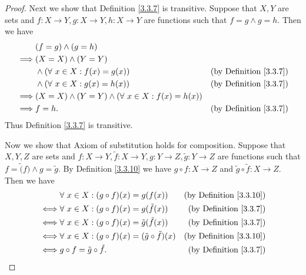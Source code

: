 \begin{proof}
    Next we show that Definition \ref{3.3.7} is transitive.
    Suppose that \(X, Y\) are sets and \(f : X \to Y, g : X \to Y, h : X \to Y\) are functions such that \(f = g \land g = h\).
    Then we have
    \begin{align*}
                 & (f = g) \land (g = h)                                                                             \\
        \implies & (X = X) \land (Y = Y)                                                                             \\
                 & \land (\forall\ x \in X : f(x) = g(x))                       & \text{(by Definition \ref{3.3.7})} \\
                 & \land (\forall\ x \in X : g(x) = h(x))                       & \text{(by Definition \ref{3.3.7})} \\
        \implies & (X = X) \land (Y = Y) \land (\forall\ x \in X : f(x) = h(x))                                      \\
        \implies & f = h.                                                       & \text{(by Definition \ref{3.3.7})}
    \end{align*}
    Thus Definition \ref{3.3.7} is transitive.

    Now we show that Axiom of substitution holds for composition.
    Suppose that \(X, Y, Z\) are sets and \(f : X \to Y, \tilde{f} : X \to Y, g : Y \to Z, \tilde{g} : Y \to Z\) are functions such that \(f = \tilde(f) \land g = \tilde{g}\).
    By Definition \ref{3.3.10} we have \(g \circ f : X \to Z\) and \(\tilde{g} \circ \tilde{f} : X \to Z\).
    Then we have
    \begin{align*}
             & \forall\ x \in X : (g \circ f)(x) = g(f(x))                        & \text{(by Definition \ref{3.3.10})} \\
        \iff & \forall\ x \in X : (g \circ f)(x) = g(\tilde{f}(x))                & \text{(by Definition \ref{3.3.7})}  \\
        \iff & \forall\ x \in X : (g \circ f)(x) = \tilde{g}(\tilde{f}(x))        & \text{(by Definition \ref{3.3.7})}  \\
        \iff & \forall\ x \in X : (g \circ f)(x) = (\tilde{g} \circ \tilde{f})(x) & \text{(by Definition \ref{3.3.10})} \\
        \iff & g \circ f = \tilde{g} \circ \tilde{f}.                             & \text{(by Definition \ref{3.3.7})}
    \end{align*}
\end{proof}

